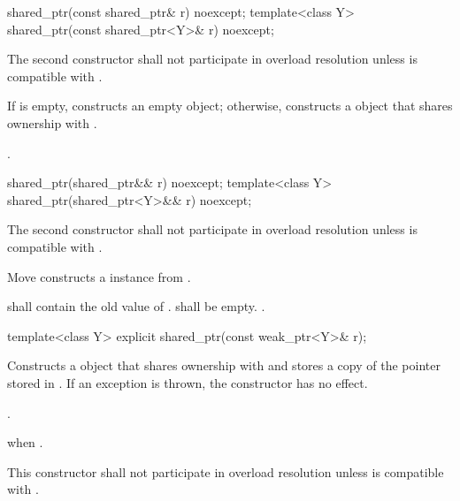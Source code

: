 %
\begin{itemdecl}
shared_ptr(const shared_ptr& r) noexcept;
template<class Y> shared_ptr(const shared_ptr<Y>& r) noexcept;
\end{itemdecl}

\begin{itemdescr}
\pnum\remarks
The second constructor shall not participate in overload resolution unless
 is compatible with .

\pnum\effects  If  is empty, constructs
an empty  object; otherwise, constructs
a  object that shares ownership with .

\pnum\ensures  {}.
\end{itemdescr}

%
\begin{itemdecl}
shared_ptr(shared_ptr&& r) noexcept;
template<class Y> shared_ptr(shared_ptr<Y>&& r) noexcept;
\end{itemdecl}

\begin{itemdescr}
\pnum
\remarks The second constructor shall not participate in overload resolution unless
 is compatible with .

\pnum
\effects Move constructs a  instance from .

\pnum
\ensures {} shall contain the old value of
.  shall be empty. .
\end{itemdescr}

%
%
\begin{itemdecl}
template<class Y> explicit shared_ptr(const weak_ptr<Y>& r);
\end{itemdecl}

\begin{itemdescr}
\pnum\effects  Constructs a  object that shares ownership with
 and stores a copy of the pointer stored in .
If an exception is thrown, the constructor has no effect.

\pnum\ensures  {}.

\pnum\throws  {} when .

\pnum\remarks This constructor shall not participate in overload resolution unless
 is compatible with .
\end{itemdescr}

